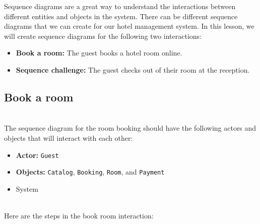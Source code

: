

Sequence diagrams are a great way to understand the interactions between different entities and objects in the system. There can be different sequence diagrams that we can create for our hotel management system. In this lesson, we will create sequence diagrams for the following two interactions:

\begin{itemize}
\item
\protect{}\label{z4YjEL15iBQRdmpCly2on}
\textbf{Book a room:} The guest books a hotel room online.
\item
\protect{}\label{fG1hXUIHSvxemUddQMdzs}
\textbf{Sequence challenge:} The guest checks out of their room at the reception.
\end{itemize}

\subsection{Book a room}\label{bPjnJLd68-tBGqb1P3u_U}
\\
The sequence diagram for the room booking should have the following actors and objects that will interact with each other:

\begin{itemize}
\item
\protect{}\label{L3hJa50USjnMXiih_qPHC}
\textbf{Actor:} \texttt{Guest}
\item
\protect{}\label{81ksXql5w5Lcr9a10EOFB}
\textbf{Objects:} \texttt{Catalog}, \texttt{Booking}, \texttt{Room}, and \texttt{Payment}
\item
\protect{}\label{Z-FJ7LOHFTa5GtBeukGLq}
System
\end{itemize}
\\
Here are the steps in the book room interaction:

